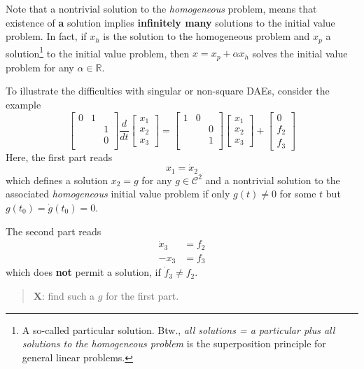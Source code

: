 \documentclass[]{book}
\newenvironment {JHSAYS} [0] {\begin{quote}\color{jhsc}} {\end{quote}}
\theoremstyle{definition}
\theoremstyle{definition}
\theoremstyle{definition}
\theoremstyle{definition}
\theoremstyle{remark}
\begin{document}
Note that a nontrivial solution to the \emph{homogeneous} problem, means that existence of \textbf{a} solution implies \textbf{infinitely many} solutions to the initial value problem. In fact, if \(x_h\) is the solution to the homogeneous problem and \(x_p\) a solution\footnote{A so-called particular solution. Btw., \emph{all solutions = a particular plus all solutions to the homogeneous problem} is the superposition principle for general linear problems.} to the initial value problem, then \(x = x_p + \alpha x_h\) solves the initial value problem for any \(\alpha \in \mathbb R\).

To illustrate the difficulties with singular or non-square DAEs, consider the example
\[
\begin{bmatrix}
0 & 1 & \\
&& 1  \\
&& 0  \\
\end{bmatrix}
\frac{d}{dt}
\begin{bmatrix}
x_1 \\ x_2 \\ x_3
\end{bmatrix}
=
\begin{bmatrix}
1 & 0 & \\
&& 0  \\
&& 1  \\
\end{bmatrix}
\begin{bmatrix}
x_1 \\ x_2 \\ x_3
\end{bmatrix}
+
\begin{bmatrix}
0 \\ f_2 \\ f_3
\end{bmatrix}
\]
Here, the first part reads
\[
x_1 = \dot x_2
\]
which defines a solution \(x_2=g\) for any \(g \in \mathcal C^2\) and a nontrivial solution to the associated \emph{homogeneous} initial value problem if only \(g(t)\neq 0\) for some \(t\) but \(g(t_0)=\dot g(t_0) = 0\).

The second part reads
\begin{align*}
\dot x_3 &= f_2 \\
-x_3 &= f_3
\end{align*}
which does \textbf{not} permit a solution, if \({\dot{f}}_3 \neq f_2\).

\begin{JHSAYS}
\textbf{X}: find such a \(g\) for the first part.
\end{JHSAYS}
\end{document}
